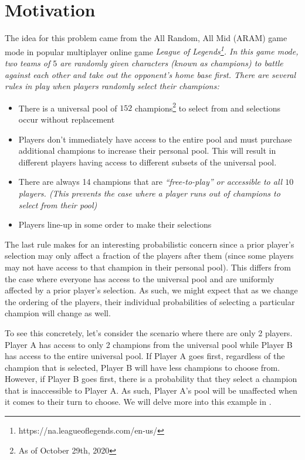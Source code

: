 \section{Motivation}\label{Section:Motivation}

The idea for this problem came from the All Random, All Mid (ARAM) game mode in popular multiplayer online game \it{League of Legends}\footnote{https://na.leagueoflegends.com/en-us/}.
In this game mode, two teams of $5$ are randomly given characters (known as champions) to battle against each other and take out the opponent's home base first.
There are several rules in play when players randomly select their champions:
\begin{itemize}
    \item There is a universal pool of $152$ champions\footnote{As of October 29th, 2020} to select from and selections occur without replacement 
    \item Players don't immediately have access to the entire pool and must purchase additional champions to increase their personal pool. This will result in different players having access to different subsets of the universal pool.
    \item There are always 14 champions that are \it{``free-to-play''} or accessible to all $10$ players. (This prevents the case where a player runs out of champions to select from their pool)
    \item Players line-up in some order to make their selections
\end{itemize}
The last rule makes for an interesting probabilistic concern since a prior player's selection may only affect a fraction of the players after them (since some players may not have access to that champion in their personal pool).
This differs from the case where everyone has access to the universal pool and are uniformly affected by a prior player's selection.
As such, we might expect that as we change the ordering of the players, their individual probabilities of selecting a particular champion will change as well.

To see this concretely, let's consider the scenario where there are only 2 players.
Player A has access to only 2 champions from the universal pool while Player B has access to the entire universal pool.
If Player A goes first, regardless of the champion that is selected, Player B will have less champions to choose from.
However, if Player B goes first, there is a probability that they select a champion that is inaccessible to Player A.
As such, Player A's pool will be unaffected when it comes to their turn to choose.
We will delve more into this example in .
